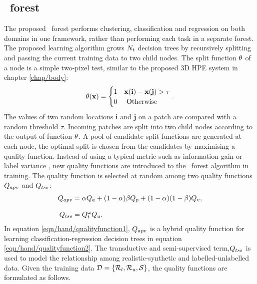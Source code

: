 \subsection{\STR\ forest} 
The proposed \STR\ forest performs clustering, classification and regression on both domains in one framework, rather than performing each task in a separate forest. 
The proposed learning algorithm grows $N_{t}$ decision trees by recursively splitting and passing the current training data to two child nodes. 
The split function $\theta$ of a node is a simple two-pixel test, similar to the proposed 3D HPE system in chapter \ref{chap/body}: 
\begin{equation}
	\theta(\mathbf{x}) = \begin{cases} 
		1 & \mathbf{x}(\textbf{i})-\mathbf{x}(\textbf{j}) > \tau \\
		0 & \mbox{ Otherwise } \\
	\end{cases}.
	\label{eqn/hand/pixeltest}
\end{equation}
The values of two random locations $\textbf{i}$ and $\textbf{j}$ on a patch are compared with a random threshold $\tau$. Incoming patches are split into two child nodes according to the output of function $\theta$. 
A pool of candidate split functions are generated at each node, the optimal split is chosen from the candidates by maximising a quality function.   
Instead of using a typical metric such as information gain \cite{Breiman2001} or label variance \cite{Shotton2013}, new quality functions are introduced to the \STR\ forest algorithm in training. The quality function is selected at random among two quality functions $Q_{apv}$ and $Q_{tss}$: 
\begin{align}
	\label{eqn/hand/qualityfunction1}
	Q_{apv} & = \alpha Q_{a} + (1 - \alpha)\beta Q_{p} + (1 - \alpha)(1 - \beta)Q_{v},  \\[3mm] 
	\label{eqn/hand/qualityfunction2}
	Q_{tss} & = Q_{t}^{\omega}Q_{u}.
\end{align}
In equation \ref{eqn/hand/qualityfunction1}, $Q_{apv}$ is a hybrid quality function for learning classification-regression decision trees in equation \ref{eqn/hand/qualityfunction2}. The transductive and semi-supervised term,$Q_{tss}$ is used to model the relationship among realistic-synthetic and labelled-unlabelled data. Given the training data $\mathcal{D} = \{\mathcal{R}_{l}, \mathcal{R}_{u}, \mathcal{S}\}$, the quality functions are formulated as follows.   

